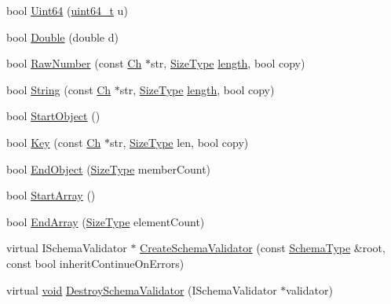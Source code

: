 \begin{DoxyCompactItemize}
\item 
bool \hyperlink{classGenericSchemaValidator_abfc56c58cf0b65318e376fc5f2879292}{Uint64} (\hyperlink{stdint_8h_aec6fcb673ff035718c238c8c9d544c47}{uint64\+\_\+t} u)
\item 
bool \hyperlink{classGenericSchemaValidator_aed0532dbda3ac6f3ca7196af06066b86}{Double} (double d)
\item 
bool \hyperlink{classGenericSchemaValidator_ae4f024145421d2c1dde08a9de528722a}{Raw\+Number} (const \hyperlink{classGenericSchemaValidator_a8b7dab5a0cda9cc0adaefb4401d260c1}{Ch} $\ast$str, \hyperlink{rapidjson_8h_a5ed6e6e67250fadbd041127e6386dcb5}{Size\+Type} \hyperlink{imgui__impl__opengl3__loader_8h_a011fc24f10426c01349e94a4edd4b0d5}{length}, bool copy)
\item 
bool \hyperlink{classGenericSchemaValidator_a33cf3f83307a8fea38c3238ef75c3d58}{String} (const \hyperlink{classGenericSchemaValidator_a8b7dab5a0cda9cc0adaefb4401d260c1}{Ch} $\ast$str, \hyperlink{rapidjson_8h_a5ed6e6e67250fadbd041127e6386dcb5}{Size\+Type} \hyperlink{imgui__impl__opengl3__loader_8h_a011fc24f10426c01349e94a4edd4b0d5}{length}, bool copy)
\item 
bool \hyperlink{classGenericSchemaValidator_a59972d612c3d37aae9a30222e428d216}{Start\+Object} ()
\item 
bool \hyperlink{classGenericSchemaValidator_a6d08b458216ec4a09eed9d94800d05c1}{Key} (const \hyperlink{classGenericSchemaValidator_a8b7dab5a0cda9cc0adaefb4401d260c1}{Ch} $\ast$str, \hyperlink{rapidjson_8h_a5ed6e6e67250fadbd041127e6386dcb5}{Size\+Type} len, bool copy)
\item 
bool \hyperlink{classGenericSchemaValidator_aa89e14f0f731f6acdec22a0f7e003037}{End\+Object} (\hyperlink{rapidjson_8h_a5ed6e6e67250fadbd041127e6386dcb5}{Size\+Type} member\+Count)
\item 
bool \hyperlink{classGenericSchemaValidator_aba13751f802531ed8cbd850778ea993c}{Start\+Array} ()
\item 
bool \hyperlink{classGenericSchemaValidator_a67b501f0f65d40e0086ca8216882b34f}{End\+Array} (\hyperlink{rapidjson_8h_a5ed6e6e67250fadbd041127e6386dcb5}{Size\+Type} element\+Count)
\item 
virtual I\+Schema\+Validator $\ast$ \hyperlink{classGenericSchemaValidator_a48c724c1255cf1fcc53df75c791423a9}{Create\+Schema\+Validator} (const \hyperlink{classGenericSchemaValidator_ac79628f00f6720bbabb70b44f0d076a0}{Schema\+Type} \&root, const bool inherit\+Continue\+On\+Errors)
\item 
virtual \hyperlink{imgui__impl__opengl3__loader_8h_ac668e7cffd9e2e9cfee428b9b2f34fa7}{void} \hyperlink{classGenericSchemaValidator_ae24fa298e328f1fd7dda2ef6267156d2}{Destroy\+Schema\+Validator} (I\+Schema\+Validator $\ast$validator)

\end{DoxyCompactItemize}

